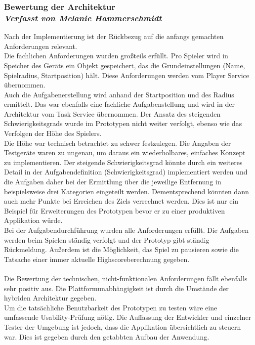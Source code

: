 \subsubsection[Bewertung der Architektur]{Bewertung der Architektur
 \\ \textnormal{\small{\textit {Verfasst von Melanie Hammerschmidt}}}}
Nach der Implementierung ist der Rückbezug auf die anfangs gemachten Anforderungen relevant.
\\
Die fachlichen Anforderungen wurden großteils erfüllt. Pro Spieler wird in Speicher des Geräts ein Objekt gespeichert, das die Grundeinstellungen (Name, Spielradius, Startposition) hält. Diese Anforderungen werden vom Player Service übernommen.
\\
Auch die Aufgabenerstellung wird anhand der Startposition und des Radius ermittelt. Das war ebenfalls eine fachliche Aufgabenstellung und wird in der Architektur vom Task Service übernommen. Der Ansatz des steigenden Schwierigkeitsgrads wurde im Prototypen nicht weiter verfolgt, ebenso wie das Verfolgen der Höhe des Spielers.
\\
Die Höhe war technisch betrachtet zu schwer festzulegen. Die Angaben der Testgeräte waren zu ungenau, um daraus ein wiederholbares, einfaches Konzept zu implementieren. Der steigende Schwierigkeitsgrad könnte durch ein weiteres Detail in der Aufgabendefinition (Schwierigkeitsgrad) implementiert werden und die Aufgaben daher bei der Ermittlung über die jeweilige Entfernung in beispielsweise drei Kategorien eingeteilt werden. Dementsprechend könnten dann auch mehr Punkte bei Erreichen des Ziels verrechnet werden.
Dies ist nur ein Beispiel für Erweiterungen des Prototypen bevor er zu einer produktiven Applikation würde.
\\
Bei der Aufgabendurchführung wurden alle Anforderungen erfüllt. Die Aufgaben werden beim Spielen ständig verfolgt und der Prototyp gibt ständig Rückmeldung. Außerdem ist die Möglichkeit, das Spiel zu pausieren sowie die Tatsache einer immer aktuelle Highscoreberechnung gegeben.
\\
\\
Die Bewertung der technischen, nicht-funktionalen Anforderungen fällt ebenfalls sehr positiv aus. Die Plattformunabhängigkeit ist durch die Umstände der hybriden Architektur gegeben.
\\
Um die tatsächliche Benutzbarkeit des Prototypen zu testen wäre eine umfassende Usability-Prüfung nötig. Die Auffassung der Entwickler und einzelner Tester der Umgebung ist jedoch, dass die Applikation übersichtlich zu steuern war. Dies ist gegeben durch den getabbten Aufbau der Anwendung. 
